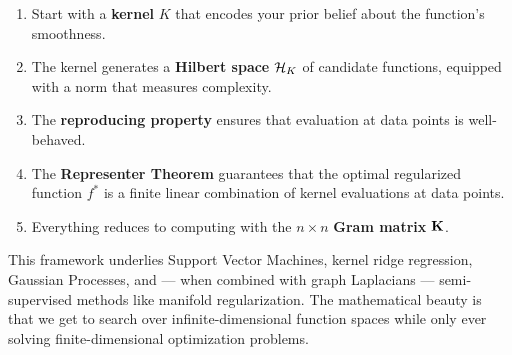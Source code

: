 \begin{notechapter}
\begin{enumerate}[label=\textbf{\arabic*.}]
  \item Start with a \textbf{kernel} $K$ that encodes your prior belief
  about the function's smoothness.
  \item The kernel generates a \textbf{Hilbert space} $\mathcal{H}_K$ of candidate
  functions, equipped with a norm that measures complexity.
  \item The \textbf{reproducing property} ensures that evaluation at
  data points is well-behaved.
  \item The \textbf{Representer Theorem} guarantees that the optimal
  regularized function $f^*$ is a finite linear combination of kernel
  evaluations at data points.
  \item Everything reduces to computing with the $n \times n$
  \textbf{Gram matrix} $\mathbf{K}$.
\end{enumerate}

This framework underlies Support Vector Machines, kernel ridge
regression, Gaussian Processes, and --- when combined with graph
Laplacians --- semi-supervised methods like manifold regularization. The
mathematical beauty is that we get to search over infinite-dimensional
function spaces while only ever solving finite-dimensional optimization
problems.
\end{notechapter}
